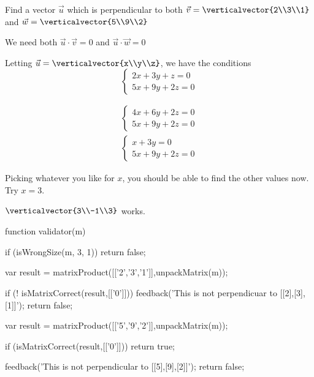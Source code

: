 \documentclass{ximera}
\begin{document}
\begin{question}
  Find a vector $\vec{u}$ which is perpendicular to both $\vec{v} = \verticalvector{2\\3\\1}$ and $\vec{w} = \verticalvector{5\\9\\2}$
  \begin{solution}
    \begin{hint}
      We need both $\vec{u} \cdot \vec{v}=0 $ and $\vec{u}\cdot \vec{w}=0$
    \end{hint}
    \begin{hint}
      Letting $\vec{u} = \verticalvector{x\\y\\z}$, we have the conditions
      \[
      \begin{cases}
        2x+3y+z=0\\
        5x+9y+2z=0
      \end{cases}
      \]
    \end{hint}
    \begin{hint}
      \begin{align*}
        \begin{cases}
          4x+6y+2z=0\\
          5x+9y+2z=0
        \end{cases}
        \\
        \begin{cases}
          x+3y = 0\\
          5x+9y+2z=0
        \end{cases}
      \end{align*}
    \end{hint}
    \begin{hint}
      Picking whatever you like for $x$, you should be able to find the other values now.  Try $x=3$.
    \end{hint}
    \begin{hint}
      $\verticalvector{3\\-1\\3}$ works.
    \end{hint}
    \begin{matrix-answer}
    function validator(m) {
      if (isWrongSize(m, 3, 1)) return false;

      var result = matrixProduct([['2','3','1']],unpackMatrix(m));

      if (! isMatrixCorrect(result,[['0']])) {
        feedback('This is not perpendicuar to [[2],[3],[1]]');
        return false;
      }

      var result = matrixProduct([['5','9','2']],unpackMatrix(m));

      if (isMatrixCorrect(result,[['0']]))
        return true;
      
      feedback('This is not perpendicular to [[5],[9],[2]]');
      return false;
    }
    \end{matrix-answer}
  \end{solution}
\end{question}
    
\end{document}
